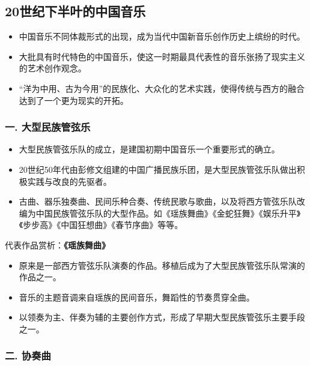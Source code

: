 \documentclass[
]{article}
\begin{document}
\subsection{20世纪下半叶的中国音乐}\label{ux4e16ux7eaaux4e0bux534aux53f6ux7684ux4e2dux56fdux97f3ux4e50}

\begin{itemize}
\item
  中国音乐不同体裁形式的出现，成为当代中国新音乐创作历史上缤纷的时代。
\item
  大批具有时代特色的中国音乐，使这一时期最具代表性的音乐张扬了现实主义的艺术创作观念。
\item
  ``洋为中用、古为今用''的民族化、大众化的艺术实践，使得传统与西方的融合达到了一个更为现实的开拓。
\end{itemize}

\subsubsection{一.
大型民族管弦乐}\label{ux4e00.-ux5927ux578bux6c11ux65cfux7ba1ux5f26ux4e50}

\begin{itemize}
\item
  大型民族管弦乐队的成立，是建国初期中国音乐一个重要形式的确立。
\item
  20世纪50年代由彭修文组建的中国广播民族乐团，是大型民族管弦乐队做出积极实践与改良的先驱者。
\item
  古曲、器乐独奏曲、民间乐种合奏、传统民歌与歌曲，以及将西方管弦乐队改编为中国民族管弦乐队的大型作品。如《瑶族舞曲》《金蛇狂舞》《娱乐升平》《步步高》《中国狂想曲》《春节序曲》等等。
\end{itemize}

代表作品赏析：\textbf{《瑶族舞曲》}

\begin{itemize}
\item
  原来是一部西方管弦乐队演奏的作品。移植后成为了大型民族管弦乐队常演的作品之一。
\item
  音乐的主题音调来自瑶族的民间音乐，舞蹈性的节奏贯穿全曲。
\item
  以领奏为主、伴奏为辅的主要创作方式，形成了早期大型民族管弦乐主要手段之一。
\end{itemize}

\subsubsection{二. 协奏曲}\label{ux4e8c.-ux534fux594fux66f2}
\end{document}
